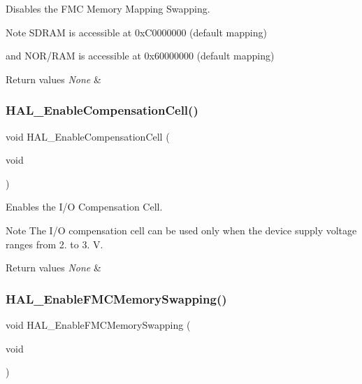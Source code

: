 Disables the F\+MC Memory Mapping Swapping. 

\begin{DoxyNote}{Note}
S\+D\+R\+AM is accessible at 0x\+C0000000 (default mapping)
\end{DoxyNote}
and N\+O\+R/\+R\+AM is accessible at 0x60000000 (default mapping)


\begin{DoxyRetVals}{Return values}
{\em None} & \\
\hline
\end{DoxyRetVals}
\mbox{\label{group___h_a_l___exported___functions___group2_ga20b6ca07582e10aec5e15ad2fda7dfc1}} 
\subsubsection{\texorpdfstring{HAL\_EnableCompensationCell()}{HAL\_EnableCompensationCell()}}
{\footnotesize\ttfamily void H\+A\+L\+\_\+\+Enable\+Compensation\+Cell (\begin{DoxyParamCaption}\item[{void}]{ }\end{DoxyParamCaption})}



Enables the I/O Compensation Cell. 

\begin{DoxyNote}{Note}
The I/O compensation cell can be used only when the device supply voltage ranges from 2. to 3. V.
\end{DoxyNote}

\begin{DoxyRetVals}{Return values}
{\em None} & \\
\hline
\end{DoxyRetVals}
\mbox{\label{group___h_a_l___exported___functions___group2_gac99ad862d5888a2672fdf7da1b8b25cd}} 
\subsubsection{\texorpdfstring{HAL\_EnableFMCMemorySwapping()}{HAL\_EnableFMCMemorySwapping()}}
{\footnotesize\ttfamily void H\+A\+L\+\_\+\+Enable\+F\+M\+C\+Memory\+Swapping (\begin{DoxyParamCaption}\item[{void}]{ }\end{DoxyParamCaption})}



